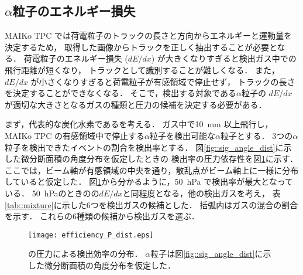 \documentclass[../master]{subfiles}
\begin{document}
\subsection{$\alpha$粒子のエネルギー損失}
MAIKo TPC では荷電粒子のトラックの長さと方向からエネルギーと運動量を決定するため，
取得した画像からトラックを正しく抽出することが必要となる．
荷電粒子のエネルギー損失 ($dE/dx$) が大きくなりすぎると検出ガス中での飛行距離が短くなり，
トラックとして識別することが難しくなる．
また，$dE/dx$ が小さくなりすぎると荷電粒子が有感領域で停止せず，
トラックの長さを決定することができなくなる．
そこで，検出する対象である$\alpha$粒子の $dE/dx$ が適切な大きさとなるガスの種類と圧力の候補を決定する必要がある．

まず，代表的な炭化水素である\Methane を考える．
ガス中で\SI{10}{\milli\metre} 以上飛行し，MAIKo TPC の有感領域中で停止する$\alpha$粒子を検出可能な$\alpha$粒子とする．
3つの$\alpha$粒子を検出できたイベントの割合を検出率とする．
図\ref{fig::sig_angle_dist}に示した微分断面積の角度分布を仮定したときの
検出率の圧力依存性を図\ref{fig::efficiency_P_dist}に示す．
ここでは，ビーム軸が有感領域の中央を通り，散乱点がビーム軸上に一様に分布していると仮定した．
図\ref{fig::efficiency_P_dist}から分かるように，\SI{50}{\hecto\pascal} で検出率が最大となっている．
\SI{50}{\hecto\pascal}のときの\Methane の$dE/dx$と同程度となる，他の検出ガスを考え，
表\ref{tab::mixture}に示した6つを検出ガスの候補とした．
括弧内はガスの混合の割合を示す．
これらの6種類の候補から検出ガスを選ぶ．
\begin{figure}
  \centering
  \texttt{[image: efficiency\_P\_dist.eps]}
  \caption[\Methane の圧力による検出効率の分布．]
          {\Methane の圧力による検出効率の分布．
            $\alpha$粒子は図\ref{fig::sig_angle_dist}に示した微分断面積の角度分布を仮定した．
           }
  \label{fig::efficiency_P_dist}
\end{figure}
\end{document}

